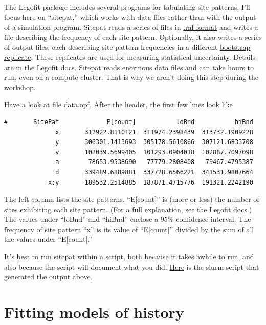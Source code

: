 \documentclass[11pt]{article}
\begin{document}
The Legofit package includes several programs for tabulating site
patterns. I'll focus here on ``sitepat,'' which works with data files
rather than with the output of a simulation program. Sitepat reads a
series of files in
\href{http://alanrogers.github.io/legofit/html/index.html#sitepattern}{.raf
  format} and writes a file describing the frequency of each site
pattern. Optionally, it also writes a series of output files, each
describing site pattern frequencies in a different
\href{https://en.wikipedia.org/wiki/Bootstrapping_(statistics)}{bootstrap
  replicate}. These replicates are used for measuring statistical
uncertainty. Details are in the
\href{https://alanrogers.github.io/legofit/html/sitepat.html}{Legofit
  docs}. Sitepat reads enormous data files and can take hours to run,
even on a compute cluster. That is why we aren't doing this step
during the workshop.

Have a look at file
\href{https://github.com/alanrogers/agar22/blob/main/legofit/europe/data.opf}{data.opf}. After
the header, the first few lines look like
\begin{verbatim}
#       SitePat             E[count]           loBnd           hiBnd
              x       312922.8110121  311974.2398439  313732.1909228
              y       306301.1413693  305178.5610866  307121.6833708
              v       102039.5699405  101293.0904018  102887.7097098
              a        78653.9538690   77779.2808408   79467.4795387
              d       339489.6889881  337728.6566221  341531.9807664
            x:y       189532.2514885  187871.4715776  191321.2242190
\end{verbatim}
The left column lists the site patterns. ``E[count]'' is (more or
less) the number of sites exhibiting each site pattern. (For a full
explanation, see the
\href{https://alanrogers.github.io/legofit/html/index.html#sitepattern}{Legofit
  docs}.) The values under ``loBnd'' and ``hiBnd'' enclose a 95\%
confidence interval. The frequency of site pattern ``x'' is its value
of ``E[count]'' divided by the sum of all the values under ``E[count].''

It's best to run sitepat within a script, both because it takes awhile
to run, and also because the script will document what you did.
\href{https://github.com/alanrogers/agar22/blob/main/legofit/europe/sitepat.slr}{Here}
is the slurm script that generated the output above.

\section{Fitting models of history}
\label{sec.fit}
\end{document}
